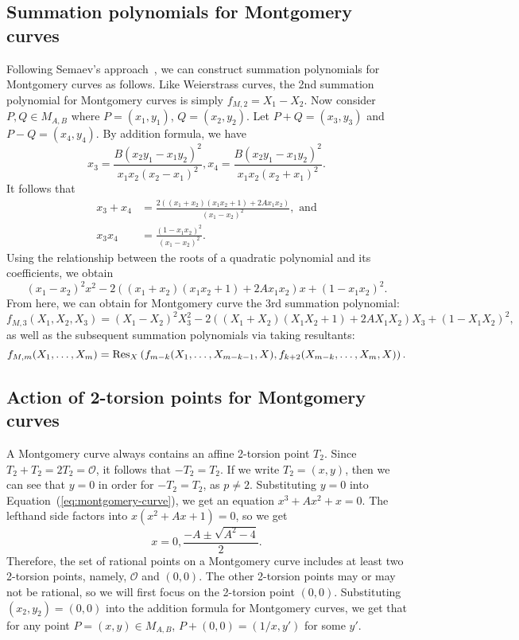 \subsection{Summation polynomials for Montgomery curves}

Following Semaev's approach~\cite{DBLP:journals/iacr/Semaev04}, we can
construct summation polynomials for Montgomery curves as follows.
%
Like Weierstrass curves, the 2nd summation polynomial for Montgomery
curves is simply $f_{M,2} = X_1 - X_2$.
%
Now consider $P,Q\in M_{A, B}$ where $P=(x_1, y_1)$, $Q=(x_2, y_2)$.
%
Let $P+Q=(x_3, y_3)$ and $P-Q=(x_4, y_4)$.
%
By addition formula, we have
\[ x_3 = \frac{B(x_2y_1 - x_1y_2)^2} {x_1x_2(x_2 - x_1)^2},
  x_4 =\frac{B(x_2y_1 - x_1y_2)^2} {x_1x_2(x_2 + x_1)^2}. \]
%
It follows that
%
\begin{align*}
  x_3 + x_4&=\frac{2\left((x_1 + x_2)(x_1x_2 + 1) + 2Ax_1x_2\right)}{(x_1 - x_2)^2},\text{ and} \\
  x_3x_4&=\frac{(1 - x_1x_2)^2}{(x_1 - x_2)^2}.
\end{align*}
%
Using the relationship between the roots of a quadratic polynomial and
its coefficients, we obtain
\[ (x_1 - x_2)^2x^2 - 2\left((x_1 + x_2)(x_1x_2 + 1) +
    2Ax_1x_2\right)x + (1 - x_1x_2)^2. \]
%
From here, we can obtain for Montgomery curve the 3rd summation
polynomial:
\[ f_{M,3}(X_1,X_2,X_3) = (X_1 - X_2)^2X_3^2 - 2\left((X_1 +
    X_2)(X_1X_2 + 1) + 2AX_1X_2\right)X_3 + (1-X_1X_2)^2, \]
%
as well as the subsequent summation polynomials via taking resultants:
\[ f_{M,m}(X_1,\ldots,X_m) =
  \operatorname{Res}_X\left(f_{m-k}(X_1,\ldots,X_{m-k-1},X),f_{k+2}(X_{m-k},\ldots,X_m,X)\right). \]
\subsection{Action of 2-torsion points for Montgomery curves} \label{subsec:TSPL}
A Montgomery curve always contains an affine 2-torsion point $T_2$.
%
Since $T_2+T_2=2T_2=\mathcal O$, it follows that $-T_2=T_2$.
%
If we write $T_2=(x,y)$, then we can see that $y=0$ in order for
$-T_2=T_2$, as $p\neq 2$.
%
Substituting $y=0$ into Equation~(\ref{eq:montgomery-curve}),
we get an equation $x^3+Ax^2+x=0$.
%
The lefthand side factors into $x(x^2+Ax+1)=0$, so we get \[
  x=0,\frac{-A\pm\sqrt{A^2 - 4}}{2}. \]
%
Therefore, the set of rational points on a Montgomery curve includes
at least two 2-torsion points, namely, $\mathcal O$ and $(0,0)$.
%
The other 2-torsion points may or may not be rational, so we will
first focus on the 2-torsion point $(0,0)$.
%
Substituting $(x_2,y_2)=(0,0)$ into the addition formula for
Montgomery curves, we get that for any point $P=(x,y)\in M_{A,B}$,
$P+(0,0)=(1/x,y')$ for some $y'$.

